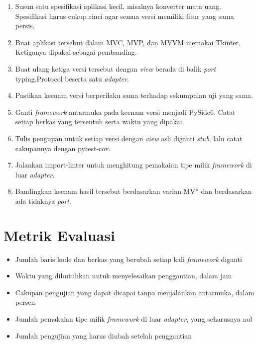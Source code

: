 \documentclass[11pt,a4paper]{article}
\begin{document}
\begin{enumerate}[leftmargin=*]
  \item Susun satu spesifikasi aplikasi kecil, misalnya konverter mata uang. Spesifikasi harus cukup rinci agar semua versi memiliki fitur yang sama persis.
  \item Buat aplikasi tersebut dalam MVC, MVP, dan MVVM memakai Tkinter. Ketiganya dipakai sebagai pembanding.
  \item Buat ulang ketiga versi tersebut dengan \textit{view} berada di balik \textit{port} typing.Protocol beserta satu \textit{adapter}.
  \item Pastikan keenam versi berperilaku sama terhadap sekumpulan uji yang sama.
  \item Ganti \textit{framework} antarmuka pada keenam versi menjadi PySide6. Catat setiap berkas yang tersentuh serta waktu yang dipakai.
  \item Tulis pengujian untuk setiap versi dengan \textit{view} asli diganti \textit{stub}, lalu catat cakupannya dengan pytest-cov.
  \item Jalankan import-linter untuk menghitung pemakaian tipe milik \textit{framework} di luar \textit{adapter}.
  \item Bandingkan keenam hasil tersebut berdasarkan varian MV* dan berdasarkan ada tidaknya \textit{port}.
\end{enumerate}

\section{Metrik Evaluasi}

\begin{itemize}[leftmargin=*]
  \item Jumlah baris kode dan berkas yang berubah setiap kali \textit{framework} diganti
  \item Waktu yang dibutuhkan untuk menyelesaikan penggantian, dalam jam
  \item Cakupan pengujian yang dapat dicapai tanpa menjalankan antarmuka, dalam persen
  \item Jumlah pemakaian tipe milik \textit{framework} di luar \textit{adapter}, yang seharusnya nol
  \item Jumlah pengujian yang harus diubah setelah penggantian
\end{itemize}



\end{document}
